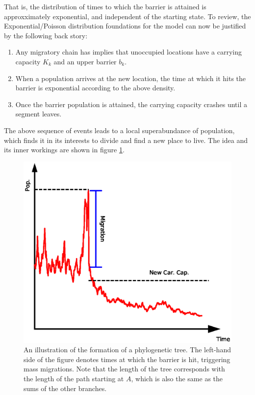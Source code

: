 \documentclass[11pt]{article}
\begin{document}
That is, the distribution of times to which the barrier is attained is approxximately exponential, and independent of the starting state. To review, the Exponential/Poisson distribution foundations for the model can now be justified by the following back story:
\begin{enumerate}
\item Any migratory chain has implies that unoccupied locations have a carrying capacity $K_k$ and an upper barrier $b_k$.  

\item When a population arrives at the new location, the time at which it hits the barrier is exponential according to the above density.  
\item Once the barrier population is attained, the carrying capacity crashes until a segment leaves.
\end{enumerate}

The above sequence of events leads to a local superabundance of population, which finds it in its interests to divide and find a new place to live. The idea and its inner workings are shown in figure \ref{evo0}.

\begin{figure}
\begin{center}
\includegraphics[width=\textwidth]{AncillaryFiles//figure25.eps}
\caption{An illustration of the formation of a phylogenetic tree. The left-hand side of the figure denotes times at which the barrier is hit, triggering mass migrations. Note that the length of the tree corresponds with the length of the path starting at $A$, which is also the same as the sums of the other branches.} \label{evo0}
\end{center} 
\end{figure}
\end{document}
